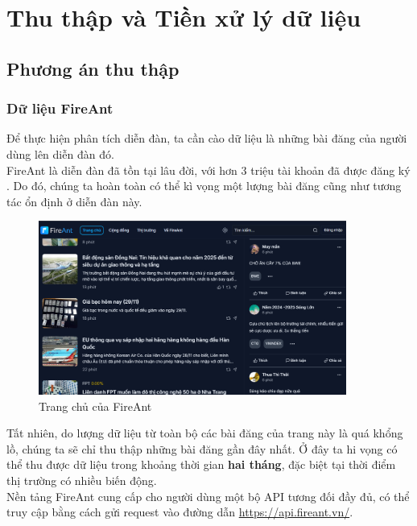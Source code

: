 \chapter{Thu thập và Tiền xử lý dữ liệu}

\section{Phương án thu thập}

\subsection{Dữ liệu FireAnt}
Để thực hiện phân tích diễn đàn, ta cần cào dữ liệu là những bài đăng của người dùng lên diễn đàn đó.\\

FireAnt là diễn đàn đã tồn tại lâu đời, với hơn 3 triệu tài khoản đã được đăng ký \cite{fireant}. Do đó, chúng ta hoàn toàn có thể kì vọng một lượng bài đăng cũng như tương tác ổn định ở diễn đàn này.

\begin{figure}[h]
    \centering
    \includegraphics[width=0.9\textwidth]{images/fig-1.1-fireant.png}
    \caption{Trang chủ của FireAnt}
    \label{fig:1.1}
\end{figure}

Tất nhiên, do lượng dữ liệu từ toàn bộ các bài đăng của trang này là quá khổng lồ, chúng ta sẽ chỉ thu thập những bài đăng gần đây nhất. Ở đây ta hi vọng có thể thu được dữ liệu trong khoảng thời gian \textbf{hai tháng}, đặc biệt tại thời điểm thị trường có nhiều biến động.\\

Nền tảng FireAnt cung cấp cho người dùng một bộ API tương đối đầy đủ, có thể truy cập bằng cách gửi request vào đường dẫn \href{https://api.fireant.vn/}{https://api.fireant.vn/}.\\

